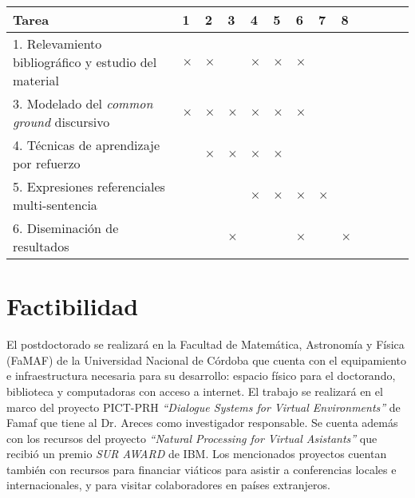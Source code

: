 \documentclass[10.9pt,a4paper]{article}
\begin{document}
{\footnotesize
\begin{center}
\begin{tabular}{|p{7cm}||p{2mm}|p{2mm}|p{2mm}|p{2mm}||p{2mm}|p{2mm}|p{2mm}|p{2mm
}||p{2mm}|p{2mm}|p{2mm}|p{2mm}||}
\hline
 \rowcolor[rgb]{0.8,0.8,0.8}\hspace{3.5cm}Tarea 
& 1 & 2 & 3 & 4 & 5 & 6 & 7 & 8 \\

\hline 1. Relevamiento bibliogr\'afico y estudio del material 
& $\times$ & $\times$ && $\times$ & $\times$ & $\times$ &&\\


\hline 3. Modelado del \emph{common ground} discursivo
& $\times$ & $\times$ & $\times$ & $\times$ & $\times$ & $\times$ &&\\

\hline 4. T\'ecnicas de aprendizaje por refuerzo
&& $\times$ & $\times$ & $\times$ & $\times$ &&&\\

\hline 5. Expresiones referenciales multi-sentencia
&&&& $\times$ & $\times$ & $\times$ & $\times$ &\\

\hline 6. Diseminaci\'on de resultados
&&& $\times$ &&& $\times$ && $\times$\\

\hline
\end{tabular}\end{center}
}



\section{Factibilidad}

El postdoctorado se realizar\'a en la Facultad de Matem\'atica, Astronom\'ia y 
F\'isica (FaMAF) de la Universidad Nacional de C\'ordoba que cuenta con el 
equipamiento e infraestructura necesaria para su desarrollo: espacio 
f\'isico para el doctorando, biblioteca y computadoras con acceso a 
internet.
El trabajo se realizar\'a en el marco del proyecto PICT-PRH 
\emph{``Dialogue Systems for Virtual Environments''} de Famaf
que tiene al Dr. Areces como investigador responsable. Se cuenta 
adem\'as con los recursos del proyecto \emph{``Natural Processing for Virtual Asistants''} que recibi\'o un premio
\emph{SUR AWARD} de IBM. 
Los mencionados proyectos cuentan tambi\'en con recursos para financiar 
vi\'aticos para asistir a conferencias locales e internacionales, y para 
visitar colaboradores en pa\'ises extranjeros.
\end{document}
